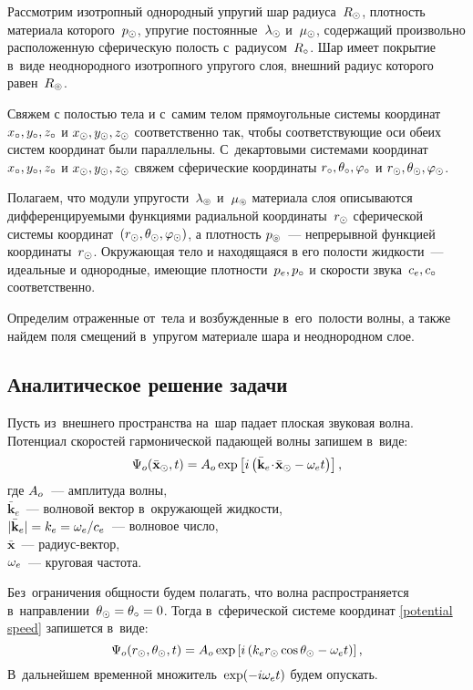 Рассмотрим изотропный однородный упругий шар радиуса~$R_\odot$, плотность материала которого~$p_\odot$, упругие постоянные~$\lambda_\odot$ и~$\mu_\odot$, содержащий произвольно расположенную сферическую полость с~радиусом~$R_\circ$. Шар имеет покрытие в~виде неоднородного изотропного упругого слоя, внешний радиус которого равен~$R_\circledcirc$.
 
Свяжем с полостью тела и с~самим телом прямоугольные системы координат $x_\circ, y_\circ, z_\circ$ и $x_\odot, y_\odot, z_\odot$ соответственно так, чтобы соответствующие оси обеих систем координат были параллельны. С~декартовыми системами координат $x_\circ, y_\circ, z_\circ$ и $x_\odot, y_\odot, z_\odot$ свяжем сферические координаты $r_\circ, \theta_\circ, \varphi_\circ$ и $r_\odot, \theta_\odot, \varphi_\odot$.

Полагаем, что модули упругости~$\lambda_\circledcirc$ и~$\mu_\circledcirc$ материала слоя описываются дифференцируемыми функциями радиальной координаты~$r_\odot$ сферической системы координат~$(r_\odot, \theta_\odot, \varphi_\odot)$, а плотность $p_\circledcirc$~--- непрерывной функцией координаты~$r_\odot$.  Окружающая тело и находящаяся в его полости жидкости~--- идеальные и однородные, имеющие плотности~$p_e, p_\circ$ и скорости звука~$c_e, c_\circ$ соответственно. 

Определим отраженные от~тела и возбужденные в~его~полости волны, а также найдем поля смещений в~упругом материале шара и неоднородном слое.


\newpage
\subsection{Аналитическое решение задачи}

Пусть из~внешнего пространства на~шар падает плоская звуковая волна. Потенциал скоростей гармонической падающей волны запишем в~виде:
\begin{equation}\label{potential speed}
\Psi_o(\bar{\mathbf{x}}_\odot, t) = A_o \exp\left[i\left(\bar{\mathbf{k}}_e\!\cdot\!\bar{\mathbf{x}}_\odot-\omega_e t\right)\right],
\end{equation}
где $A_o$~--- амплитуда волны, \\
$\bar{\mathbf{k}}_e$~--- волновой вектор в~окружающей жидкости,  \\
$\lvert\bar{\mathbf{k}}_e\rvert = k_e = \omega_e / c_e$~--- волновое число, \\
$\bar{\mathbf{x}}$~--- радиус-вектор, \\
$\omega_e$~--- круговая частота.

 Без~ограничения общности будем полагать, что волна распространяется в~направлении~$\theta_\odot = \theta_\circ = 0$. Тогда в~сферической системе координат \eqref{potential speed} запишется в~виде:
\begin{equation}
\Psi_o(r_\odot, \theta_\odot, t) = A_o \exp\left[i\left(k_e r_\odot\cos\theta_\odot - \omega_e t\right)\right],
\end{equation}
В~дальнейшем временной множитель~$\exp(-i\omega_e t)$ будем опускать.

